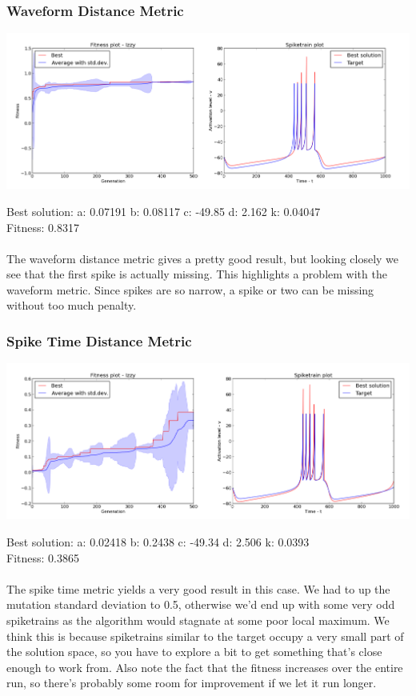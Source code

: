 \documentclass[a4paper,12pt]{article}
\begin{document}
\subsubsection{Waveform Distance Metric}
\centerline{\includegraphics[width=1.3\textwidth]{img/case1_wave}}
Best solution: 
a: 0.07191 
b: 0.08117 
c: -49.85 
d: 2.162 
k: 0.04047 \\
Fitness: 0.8317
\paragraph{}The waveform distance metric gives a pretty good result, but looking closely we see that the first spike is actually missing. This highlights a problem with the waveform metric. Since spikes are so narrow, a spike or two can be missing without too much penalty.

\subsubsection{Spike Time Distance Metric}
\centerline{\includegraphics[width=1.3\textwidth]{img/case1_time}}
Best solution: 
a: 0.02418 
b: 0.2438 
c: -49.34 
d: 2.506 
k: 0.0393 \\
Fitness: 0.3865
\paragraph{}The spike time metric yields a very good result in this case. We had to up the mutation standard deviation to 0.5, otherwise we'd end up with some very odd spiketrains as the algorithm would stagnate at some poor local maximum. We think this is because spiketrains similar to the target occupy a very small part of the solution space, so you have to explore a bit to get something that's close enough to work from. Also note the fact that the fitness increases over the entire run, so there's probably some room for improvement if we let it run longer.
\end{document}

